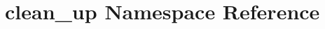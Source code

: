 \hypertarget{namespaceclean__up}{}\section{clean\+\_\+up Namespace Reference}
\label{namespaceclean__up}
